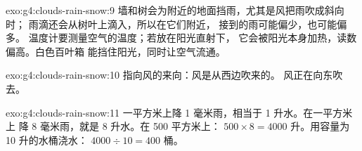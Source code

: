 \begin{solution}{exo:g4:clouds-rain-snow:9}
墙和树会为附近的地面挡雨，尤其是风把雨吹成斜向时；
雨滴还会从树叶上滴入，所以在它们附近，
接到的雨可能偏少，也可能偏多。
温度计要测量空气的温度；若放在阳光直射下，
它会被阳光本身加热，读数偏高。白色百叶箱
能挡住阳光，同时让空气流通。
\end{solution}

\begin{solution}{exo:g4:clouds-rain-snow:10}
指向风的来向：风是从西边吹来的。
风正在向东吹去。
\end{solution}

\begin{solution}{exo:g4:clouds-rain-snow:11}
一平方米上降 1 毫米雨，相当于 1 升水。在一平方米上
降 8 毫米雨，就是 8 升水。在 500 平方米上：
$500 \times 8 = 4000$ 升。用容量为 10 升的水桶浇水：
$4000 \div 10 = 400$ 桶。
\end{solution}
